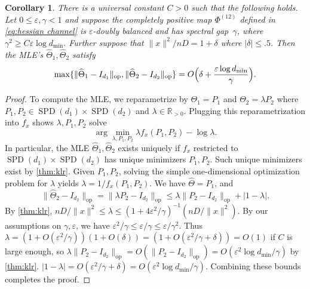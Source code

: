 \documentclass[aos]{imsart}
\newtheorem{corollary}[theorem]{Corollary}
\theoremstyle{definition}
\numberwithin{equation}{section}
\DeclareMathOperator{\op}{op}
\DeclareMathOperator{\SSPD}{SPD}
\DeclarePairedDelimiter{\norm}{\lVert}{\rVert}
\newcommand{\R}{{\mathbb{R}}}
\newcommand{\htheta}{\widehat{\Theta}}
\newcommand{\ot}{\otimes}
\newcommand{\eps}{\varepsilon}
\newcommand{\CF}[1]{{\color{purple}[CF: #1]}}
\newcommand{\CF}[1]{{}}
\begin{document}
\begin{corollary}\label{cor:klr}
There is a universal constant $C>0$ such that the following holds. Let
$0 \leq \eps, \gamma < 1$ and suppose the completely positive map $\Phi^{(12)}$ defined in \cref{eq:hessian channel} is $\eps$-doubly balanced and has spectral gap~$\gamma$, where $\gamma^2 \geq C \eps \log d_{\min}.$ Further suppose that $\|x\|^2/nD = 1 + \delta$ where $|\delta| \leq .5$.  Then the MLE's $\htheta_1, \htheta_2$ satisfy
\begin{align*}
  \max \{ \norm{\htheta_1 - I_{d_1}}_{\op}, \norm{\htheta_2 - I_{d_2}}_{\op} \} = O\Bigl(\delta + \frac{\eps \log d_{\min}}\gamma\Bigr).
\end{align*}
\end{corollary}
\begin{proof}

To compute the MLE, we reparametrize by $\Theta_1 = P_1$ and $\Theta_2 = \lambda P_2$ where $P_1,P_2 \in \SSPD(d_1) \times \SSPD(d_2)$ and $\lambda \in \R_{> 0}$. Plugging this reparametrization into $f_x$ shows $\lambda, P_1, P_2$ solve
$$\arg\min_{\lambda, P_1, P_2} \lambda f_x(P_1, P_2) - \log \lambda.$$
In particular, the MLE $\htheta_1, \htheta_2$ exists uniquely if $f_x$ restricted to $\SSPD(d_1) \times \SSPD(d_2)$ has unique minimizers $P_1, P_2$. Such unique minimizers exist by \cref{thm:klr}. Given $P_1, P_2$, solving the simple one-dimensional optimization problem for $\lambda$ yields $\lambda = 1/f_x(P_1, P_2)$. We have $\htheta = P_1$, and
$$ \|\htheta_2 - I_{d_2} \|_{\op} = \|\lambda P_2  - I_{d_2} \|_{\op} \leq \lambda \|P_2 - I_{d_2}\|_{\op} + |1 - \lambda|.$$
By \cref{thm:klr}, $nD/\|x\|^2  \leq \lambda \leq (1 + 4 \eps^2/\gamma)^{-1} (nD/\|x\|^2).$ By our assumptions on $\gamma, \eps$, we have $\eps^2/\gamma \leq \eps/\gamma \leq \eps/\gamma^2$. Thus $\lambda = (1 + O(\eps^2/\gamma))(1+ O(\delta)) = (1 + O(\eps^2/\gamma +\delta)) = O(1)$ if $C$ is large enough, so $\lambda \|P_2 - I_{d_2}\|_{\op} = O(\|P_2 - I_{d_2}\|_{\op}) = O(\eps^2 \log d_{\min}/\gamma)$ by \cref{thm:klr}. $|1 - \lambda| = O(\eps^2/\gamma +\delta) = O(\eps^2 \log d_{\min}/\gamma)$. Combining these bounds completes the proof.\end{proof}


\end{document}
